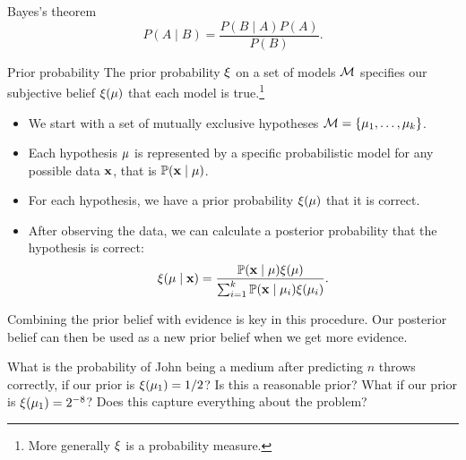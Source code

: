 \begin{frame}
  \begin{block}{Bayes's theorem}
    \[
      P(A \mid B) = \frac{P(B \mid A) P(A)}{P(B)}.
    \]
  \end{block}
  \begin{block}{Prior probability}
    The prior probability $\xi$ on a set of models ${\mathcal{M}}$ specifies our subjective belief $\xi(\mu)$ that each model is true.\footnote{More generally $\xi$ is a probability measure.}
  \end{block}
  \begin{itemize}
  \item We start with a set of mutually exclusive hypotheses ${\mathcal{M}} = \{\mu_1, \ldots, \mu_k\}$.
  \item Each hypothesis $\mu$ is represented by a specific probabilistic model for any possible data ${\mathbf{x}}$, that is $\mathop{\mbox{\ensuremath{\mathbb{P}}}}\nolimits({\mathbf{x}} \mid \mu)$.
  \item For each hypothesis, we have a prior probability $\xi(\mu)$ that it is correct.
  \item After observing the data, we can calculate a posterior probability that the hypothesis is correct:
    \[
      \xi(\mu \mid {\mathbf{x}}) = \frac{\mathop{\mbox{\ensuremath{\mathbb{P}}}}\nolimits({\mathbf{x}} \mid \mu) \xi(\mu)}{\sum_{i=1}^k \mathop{\mbox{\ensuremath{\mathbb{P}}}}\nolimits({\mathbf{x}} \mid \mu_i) \xi(\mu_i)}.
    \]
  \end{itemize}
  Combining the prior belief with evidence is key in this procedure. Our posterior belief can then be used as a new prior belief when we get more evidence.
\end{frame}
\begin{frame}
  \begin{exercise}
    What is the probability of John being a medium after predicting $n$ throws correctly, if our prior is $\xi(\mu_1) = 1/2$? Is this a reasonable prior? What if our prior is $\xi(\mu_1) = 2^{-8}$? Does this capture everything about the problem?
  \end{exercise}
\end{frame}



